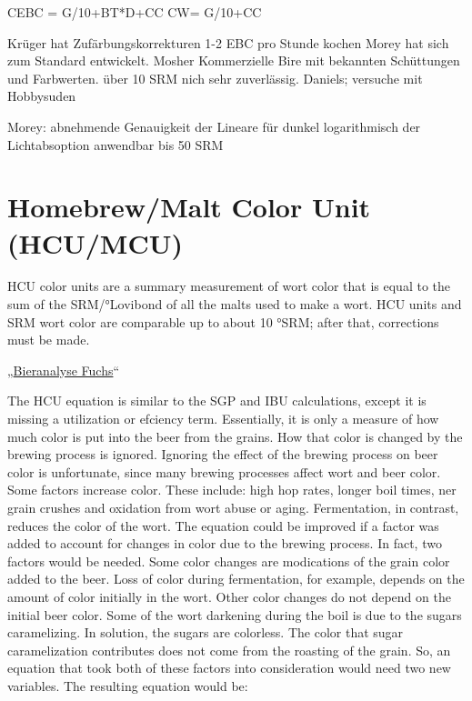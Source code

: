 \documentclass[a4paper,parskip=half]{scrartcl}
\begin{document}
CEBC = G/10+BT*D+CC
CW= G/10+CC

Krüger hat Zufärbungskorrekturen
1-2 EBC pro Stunde kochen
Morey hat sich zum Standard entwickelt.
Mosher Kommerzielle Bire mit bekannten Schüttungen und Farbwerten. über 10 SRM nich sehr zuverlässig.
Daniels; versuche mit Hobbysuden

Morey: abnehmende Genauigkeit der Lineare für dunkel logarithmisch der Lichtabsoption
anwendbar bis 50 SRM

\section*{Homebrew/Malt Color Unit (HCU/MCU)}

\parencite[11]{Noonan1996}
HCU color units are a summary measurement of
wort color that is equal to the sum of the SRM/°Lovibond
of all the malts used to make a wort. HCU units and SRM
wort color are comparable up to about 10 °SRM; after that,
corrections must be made.


„\href{https://bieranalyse.de}{Bieranalyse Fuchs}“


\parencite{Colby2000}
The HCU equation is similar to the SGP and IBU calculations, except it is missing a utilization or efciency term.
Essentially, it is only a measure of how much color is put into the beer from the grains. How that color is
changed by the brewing process is ignored.
Ignoring the effect of the brewing process on beer color is unfortunate, since many brewing processes affect
wort and beer color. Some factors increase color. These include: high hop rates, longer boil times, ner grain
crushes and oxidation from wort abuse or aging. Fermentation, in contrast, reduces the color of the wort.
The equation could be improved if a factor was added to account for changes in color due to the brewing
process. In fact, two factors would be needed. Some color changes are modications of the grain color added to
the beer. Loss of color during fermentation, for example, depends on the amount of color initially in the wort.
Other color changes do not depend on the initial beer color. Some of the wort darkening during the boil is due
to the sugars caramelizing. In solution, the sugars are colorless. The color that sugar caramelization contributes
does not come from the roasting of the grain.
So, an equation that took both of these factors into consideration would need two new variables. The resulting
equation would be:
\end{document}
